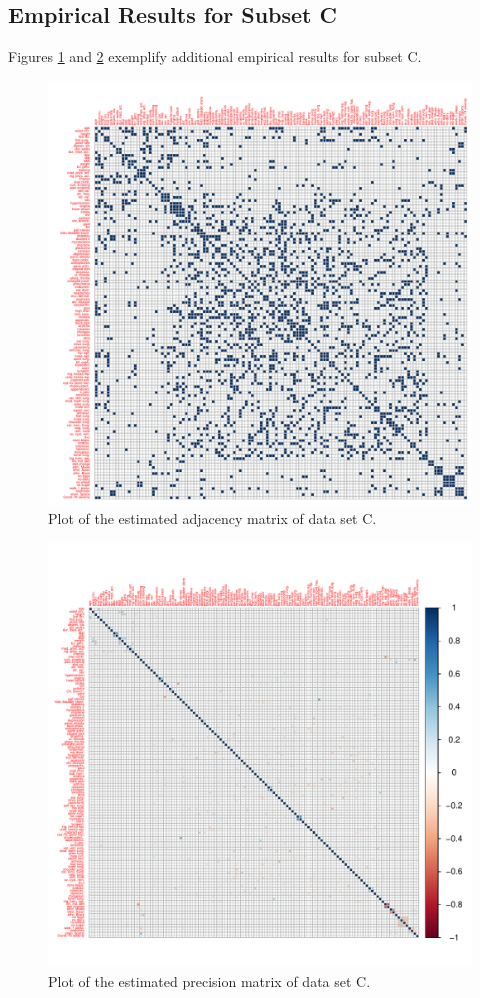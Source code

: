 \subsection*{Empirical Results for Subset C}

Figures \ref{fig:corrplot_admat_C} and \ref{fig:corrplot_omega_C} exemplify additional empirical results for subset C. 

\begin{figure}[ht]
    \centering
    \includegraphics[width=1.0\textwidth]{Figures/corrplot_admat_C.pdf}
    \caption{Plot of the estimated adjacency matrix of data set C.}
    \label{fig:corrplot_admat_C}
\end{figure}

\begin{figure}
    \centering
    \includegraphics[width=1.0\textwidth]{Figures/corrplot_omega_C.pdf}
    \caption{Plot of the estimated precision matrix of data set C.}
    \label{fig:corrplot_omega_C}
\end{figure}

